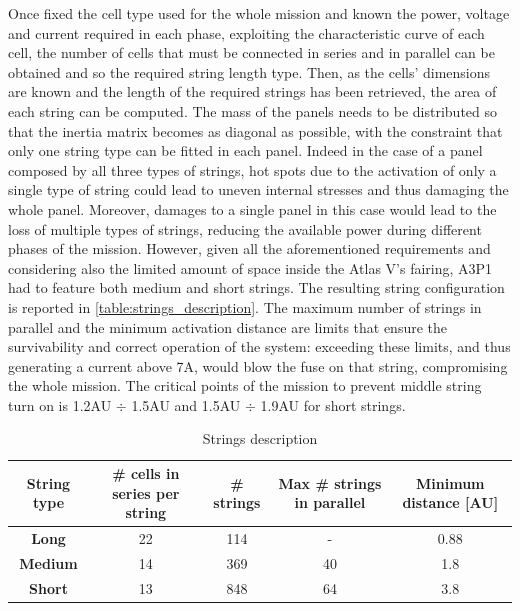  Once fixed the cell type used for the whole mission and known the power, voltage and current required in each phase, exploiting the characteristic curve of each cell, the number of cells that must be connected in series and in parallel can be obtained and so the required string length type. Then, as the cells' dimensions are known and the length of the required strings has been retrieved, the area of each string can be computed. The mass of the panels needs to be distributed so that the inertia matrix becomes as diagonal as possible, with the constraint that only one string type can be fitted in each panel.\cite{solar_panels_coef} Indeed in the case of a panel composed by all three types of strings, hot spots due to the activation of only a single type of string could lead to uneven internal stresses and thus damaging the whole panel. Moreover, damages to a single panel in this case would lead to the loss of multiple types of strings, reducing the available power during different phases of the mission.  However, given all the aforementioned requirements and considering also the limited amount of space inside the Atlas V's fairing, A3P1 had to feature both medium and short strings.\cite{solar_panels_coef} The resulting string configuration is reported in \autoref{table:strings_description}. The maximum number of strings in parallel and the minimum activation distance are limits that ensure the survivability and correct operation of the system: exceeding these limits, and thus generating a current above 7A, would blow the fuse on that string, compromising the whole mission. The critical points of the mission to prevent middle string turn on is 1.2AU $\div$ 1.5AU and 1.5AU $\div$ 1.9AU for short strings.\cite{solar_panels_coef}

 \begin{table}[H]
    \renewcommand{\arraystretch}{1.3}
    \centering
    \small
\begin{tabular}{|c|c|c|c|c|}
    \hline
    \textbf{String type} & \textbf{\# cells in series per string} & \textbf{\# strings} & \textbf{Max \# strings in parallel} & \textbf{Minimum distance [AU]}\\
    \hline
    \hline
    \textbf{Long}    &  22 & 114 & - & 0.88 \\
    \hline
    \textbf{Medium}  &  14 & 369 & 40 & 1.8\\
    \hline
    \textbf{Short}   &  13 & 848 & 64 & 3.8 \\
    \hline
\end{tabular}
\caption{Strings description}
\label{table:strings_description}
\end{table}

